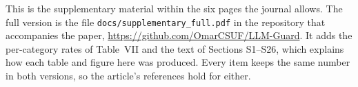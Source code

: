 This is the supplementary material within the six pages the journal allows. The full version
is the file \texttt{docs/supplementary\_full.pdf} in the repository that accompanies the paper,
\url{https://github.com/OmarCSUF/LLM-Guard}. It adds the per-category rates of Table~VII and
the text of Sections S1--S26, which explains how each table and figure here was produced. Every
item keeps the same number in both versions, so the article's references hold for either.
